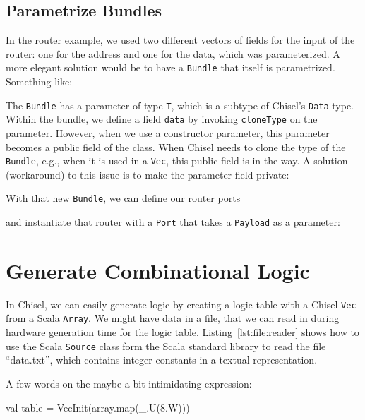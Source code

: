 \documentclass[%
    10pt,
    headinclude, footexclude,
    openright, %
    notitlepage,
    cleardoubleempty,
    headsepline,
    pointlessnumbers,
    bibtotoc, idxtotoc,
    ]{scrbook}
\newcommand{\code}[1]{{\small{\texttt{#1}}}}
\begin{document}

\subsection{Parametrize Bundles}

In the router example, we used two different vectors of fields for the input
of the router: one for the address and one for the data, which was parameterized.
A more elegant solution would be to have a \code{Bundle} that itself
is parametrized. Something like:


The \code{Bundle} has a parameter of type \code{T}, which is a subtype
of Chisel's \code{Data} type.
Within the bundle, we define a field \code{data} by invoking \code{cloneType}
on the parameter.
However, when we use a constructor parameter, this parameter becomes a
public field of the class. When Chisel needs to clone the type of the \code{Bundle},
e.g., when it is used in a \code{Vec}, this public field is in the way.
A solution (workaround) to this issue is to make the parameter field private:


\noindent With that new \code{Bundle}, we can define our router ports


\noindent and instantiate that router with a \code{Port} that takes
a \code{Payload} as a parameter:



\section{Generate Combinational Logic}

In Chisel, we can easily generate logic by creating a logic table with
a Chisel \code{Vec} from a Scala \code{Array}.
We might have data in a file, that we can read in during hardware generation
time for the logic table.
Listing~\ref{lst:file:reader} shows how to use the Scala \code{Source}
class form the Scala standard library to read the file ``data.txt'', which
contains integer constants in a textual representation.

A few words on the maybe a bit intimidating expression:
\begin{chisel}
  val table = VecInit(array.map(_.U(8.W)))
\end{chisel}
\end{document}
